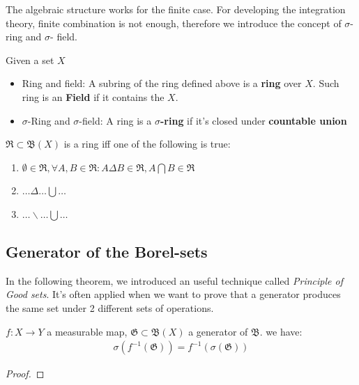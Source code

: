 The algebraic structure works for the finite case. For developing the integration theory, finite combination is not enough, therefore we introduce the concept of $\sigma$- ring and $\sigma$- field.

\begin{definition}
Given a set $X$
	\begin{itemize}
		\item Ring and field: A subring of the ring defined above is a \textbf{ring }over $X$. Such ring is an \textbf{Field} if it contains the $X$.  
		\item $\sigma$-Ring  and $\sigma$-field: A ring is a \textbf{$\sigma$-ring} if it's closed under \textbf{countable union}
	\end{itemize}
\end{definition}

\begin{theorem}
	$\mathfrak{R} \subset \mathfrak B(X)$ is a ring iff one of the following is true:
	\begin{enumerate}
		\item $\emptyset \in \mathfrak{R}, \forall A, B \in \mathfrak{R}: A \Delta B \in \mathfrak{R}, A\bigcap B \in \mathfrak{R}$
		\item $\dots\Delta\dots \bigcup \dots$
		\item $\dots\backslash\dots \bigcup \dots$
	\end{enumerate}
\end{theorem}


\subsection{Generator of the Borel-sets}
In the following theorem, we introduced an useful technique called \textit{Principle of Good sets}. It's often applied when we want to prove that a generator produces the same set under 2 different sets of operations.
\begin{theorem}
	$f: X \rightarrow Y$ a measurable map, $\mathfrak{G} \subset \mathfrak{B}(X)$ a generator of $\mathfrak{B}$. we have:
	\begin{align*}
		\sigma(f^{-1}(\mathfrak{G}) ) = f^{-1}(\sigma (\mathfrak{G}))
	\end{align*}
\end{theorem} 
\begin{proof}
\end{proof}

